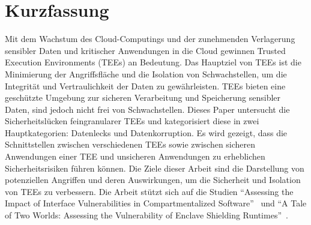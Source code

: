 \section*{Kurzfassung}
Mit dem Wachstum des Cloud-Computings und der zunehmenden Verlagerung sensibler Daten und kritischer Anwendungen in die Cloud gewinnen Trusted Execution Environments (TEEs) an Bedeutung. Das Hauptziel von TEEs ist die Minimierung der Angriffsfläche und die Isolation von Schwachstellen, um die Integrität und Vertraulichkeit der Daten zu gewährleisten. TEEs bieten eine geschützte Umgebung zur sicheren Verarbeitung und Speicherung sensibler Daten, sind jedoch nicht frei von Schwachstellen. 
Dieses Paper untersucht die Sicherheitslücken feingranularer TEEs und kategorisiert diese in zwei Hauptkategorien: Datenlecks und Datenkorruption. Es wird gezeigt, dass die Schnittstellen zwischen verschiedenen TEEs sowie zwischen sicheren Anwendungen einer TEE und unsicheren Anwendungen zu erheblichen Sicherheitsrisiken führen können.
Die Ziele dieser Arbeit sind die Darstellung von potenziellen Angriffen und deren Auswirkungen, um die Sicherheit und Isolation von TEEs zu verbessern. Die Arbeit stützt sich auf die Studien \enquote{Assessing the Impact of Interface Vulnerabilities in Compartmentalized Software}~\cite{CIVPaper} und \enquote{A Tale of Two Worlds: Assessing the Vulnerability of Enclave Shielding Runtimes}~\cite{TEEPaper}.